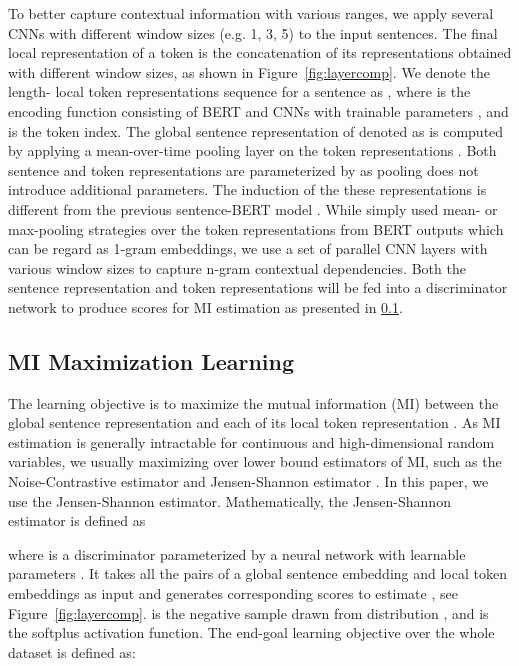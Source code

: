 \documentclass[11pt,a4paper]{article}
\begin{document}
To better capture contextual information with various ranges, we apply several CNNs with different window sizes (e.g. 1, 3, 5) to the input sentences. The final local representation of a token is the concatenation of its representations obtained with different window sizes, as shown in Figure~\ref{fig:layercomp}. We denote the length- local token representations sequence for a sentence  as , where  is the encoding function consisting of BERT and CNNs with trainable parameters , and  is the token index. The global sentence representation of  denoted as  is computed by applying a mean-over-time pooling layer on the token representations . Both sentence and token representations are parameterized by  as pooling does not  introduce additional parameters. The induction of the these representations is different from the previous sentence-BERT model \cite{reimers2019}. While \citet{reimers2019} simply used mean- or max-pooling strategies over the token representations from BERT outputs which can be regard as 1-gram embeddings, we use a set of parallel CNN layers with various window sizes to capture n-gram contextual dependencies. 
Both the sentence representation and token representations will be fed into a discriminator network to produce scores for MI estimation as presented in \ref{mim}. 


\subsection{MI Maximization Learning}
\label{mim}
The learning objective is to maximize the mutual information (MI) between the global sentence representation  and each of its local token representation . 
As MI estimation is generally intractable for continuous and high-dimensional random variables, we usually maximizing over lower bound estimators of MI, such as the Noise-Contrastive estimator \cite{gutmann2012noise} and Jensen-Shannon estimator \cite{nowozin2016, hjelm2019}. In this paper, we use the Jensen-Shannon estimator. Mathematically, the Jensen-Shannon estimator   is defined as 

where 
is a discriminator parameterized by a neural network with learnable parameters . It takes all the pairs of a global sentence embedding and local token embeddings as input and generates corresponding scores to estimate , see Figure~\ref{fig:layercomp}. 
 is the negative sample drawn from distribution , and  is the softplus activation function. The end-goal learning objective over the whole dataset  is defined as:
\end{document}
